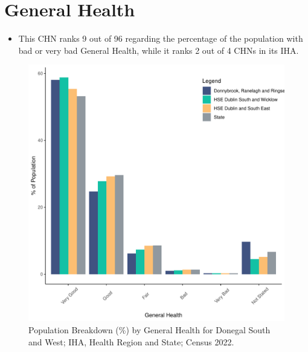 \documentclass{article}
\begin{document}
\pagebreak

\section{General Health}\label{sect:GenHealth}
\begin{itemize}
\item  This CHN ranks  9 out of 96 regarding the percentage of the population with bad or very bad General Health, while it ranks   2 out of 4 CHNs in its IHA.
\end{itemize}
\begin{figure}[h]
	\centering
	\includegraphics[width = 150mm]{../figures/GenED.pdf}
	\caption{Population Breakdown (\%) by General Health for Donegal South and West; IHA, Health Region and State;  Census 2022.}
	\label{fig:2ae19629-1a6a-13a3-e055-000000000001}
	\end{figure}
\end{document}
